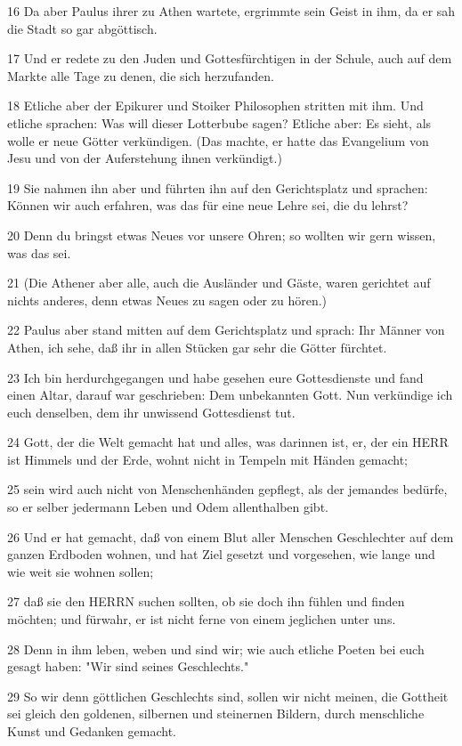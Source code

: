 \par 16 Da aber Paulus ihrer zu Athen wartete, ergrimmte sein Geist in ihm, da er sah die Stadt so gar abgöttisch.
\par 17 Und er redete zu den Juden und Gottesfürchtigen in der Schule, auch auf dem Markte alle Tage zu denen, die sich herzufanden.
\par 18 Etliche aber der Epikurer und Stoiker Philosophen stritten mit ihm. Und etliche sprachen: Was will dieser Lotterbube sagen? Etliche aber: Es sieht, als wolle er neue Götter verkündigen. (Das machte, er hatte das Evangelium von Jesu und von der Auferstehung ihnen verkündigt.)
\par 19 Sie nahmen ihn aber und führten ihn auf den Gerichtsplatz und sprachen: Können wir auch erfahren, was das für eine neue Lehre sei, die du lehrst?
\par 20 Denn du bringst etwas Neues vor unsere Ohren; so wollten wir gern wissen, was das sei.
\par 21 (Die Athener aber alle, auch die Ausländer und Gäste, waren gerichtet auf nichts anderes, denn etwas Neues zu sagen oder zu hören.)
\par 22 Paulus aber stand mitten auf dem Gerichtsplatz und sprach: Ihr Männer von Athen, ich sehe, daß ihr in allen Stücken gar sehr die Götter fürchtet.
\par 23 Ich bin herdurchgegangen und habe gesehen eure Gottesdienste und fand einen Altar, darauf war geschrieben: Dem unbekannten Gott. Nun verkündige ich euch denselben, dem ihr unwissend Gottesdienst tut.
\par 24 Gott, der die Welt gemacht hat und alles, was darinnen ist, er, der ein HERR ist Himmels und der Erde, wohnt nicht in Tempeln mit Händen gemacht;
\par 25 sein wird auch nicht von Menschenhänden gepflegt, als der jemandes bedürfe, so er selber jedermann Leben und Odem allenthalben gibt.
\par 26 Und er hat gemacht, daß von einem Blut aller Menschen Geschlechter auf dem ganzen Erdboden wohnen, und hat Ziel gesetzt und vorgesehen, wie lange und wie weit sie wohnen sollen;
\par 27 daß sie den HERRN suchen sollten, ob sie doch ihn fühlen und finden möchten; und fürwahr, er ist nicht ferne von einem jeglichen unter uns.
\par 28 Denn in ihm leben, weben und sind wir; wie auch etliche Poeten bei euch gesagt haben: "Wir sind seines Geschlechts."
\par 29 So wir denn göttlichen Geschlechts sind, sollen wir nicht meinen, die Gottheit sei gleich den goldenen, silbernen und steinernen Bildern, durch menschliche Kunst und Gedanken gemacht.
